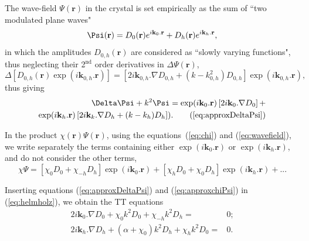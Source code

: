 \documentclass[preprint]{iucr}              %
\begin{document}
The wave-field $\Psi(\textbf{r})$ in the crystal is set empirically as the sum of ``two modulated plane waves"
\begin{equation}
\label{eq:wavefield}
    \Psi(\textbf r) = D_0(\textbf r) e^{i \textbf k_0 . \textbf r} + D_h(\textbf r) e^{i \textbf k_h . \textbf r},
\end{equation}
in which the amplitudes $D_{0,h}(\textbf{r})$ are considered as ``slowly varying functions", thus neglecting their 2$^{\text{nd}}$ order derivatives in $\Delta \Psi(\textbf{r})$,
\begin{equation}
\Delta[D_{0,h}(\textbf{r}) \exp(i\textbf{k}_{0,h} . \textbf{r})] =
 [2 i \textbf{k}_{0,h} . \nabla D_{0,h} + (k- k^2_{0,h} ) D_{0,h}] \exp(i\textbf{k}_{0,h} . \textbf{r}), \nonumber
\end{equation}
thus giving
\begin{subequations}\label{eq:approxDeltaPsi}
\begin{align}
    \Delta\Psi + k^2\Psi= 
    \exp(i \textbf{k}_0.\textbf{r})
    \left[ 2 i \textbf{k}_0 . \nabla D_0 \right] + \nonumber \\
    \exp(i \textbf{k}_h.\textbf{r})
    \left[ 2 i \textbf{k}_k . \nabla D_h + (k-k_h) D_h \right]). \tag{\ref{eq:approxDeltaPsi}}
\end{align}
\end{subequations}

In the product $\chi(\textbf{r}) \Psi(\textbf{r})$, using the equations~(\ref{eq:chi}) and (\ref{eq:wavefield}), we write separately the terms containing either $\exp(i \textbf{k}_0 . \textbf{r})$ or $\exp(i \textbf{k}_h . \textbf{r})$, and do not consider the other terms,
\begin{equation}
\label{eq:approxchiPsi}
\chi\Psi =
[\chi_0 D_0 + \chi_{-h} D_h ] \exp(i \textbf{k}_0 . \textbf{r}) +
[\chi_h D_0 + \chi_0 D_h] \exp(i \textbf{k}_h . \textbf{r})+... 
\end{equation}

Inserting equations (\ref{eq:approxDeltaPsi}) and (\ref{eq:approxchiPsi}) in (\ref{eq:helmholz}), we obtain the TT equations 
\begin{subequations}
\label{eq:TTvectorAlpha}
\begin{align}
2 i \textbf{k}_0 . \nabla D_0 + \chi_0 k^2 D_0 + \chi_{-h} k^2 D_h =& 0; \\
2 i \textbf{k}_h . \nabla D_h + (\alpha + \chi_0) k^2 D_h + \chi_{h} k^2 D_0 =& 0.
\end{align}
\end{subequations}
\end{document}
